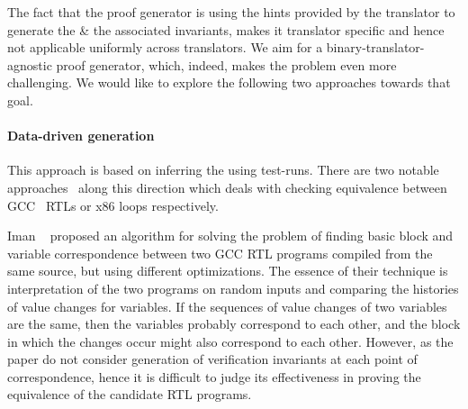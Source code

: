 The fact that the proof generator is using the hints provided by the translator
to  generate the \syncps \& the associated  invariants,  makes it  translator specific and hence not applicable
uniformly across translators. We aim for a  binary-translator-agnostic proof
generator, which, indeed, makes the problem  even more challenging. We would
like to explore the following two approaches towards that goal.

\paragraph{\textbf{Data-driven \syncp generation}} This approach
is based on inferring the \syncps using test-runs. There are two
notable approaches~\cite{Iman2005,DDEC:OOPSLA:2013} along this direction which
deals with checking equivalence between GCC~\cite{GCC} RTLs or x86 loops respectively.

Iman \etal~\cite{Iman2005} proposed an algorithm for solving the problem of
finding basic block and variable correspondence between two GCC RTL programs
compiled from the same source, but using different optimizations.  The essence
of their technique is interpretation of the two programs on random inputs and
comparing the histories of value changes for variables.  If the sequences of
value changes of two variables are the same, then the variables probably
correspond to each other, and the block in which the changes occur might also
correspond to each other. However, as the paper do not consider  generation of verification invariants  at each point of correspondence, hence it is difficult to judge  its effectiveness in proving the equivalence of the candidate 
RTL programs.




